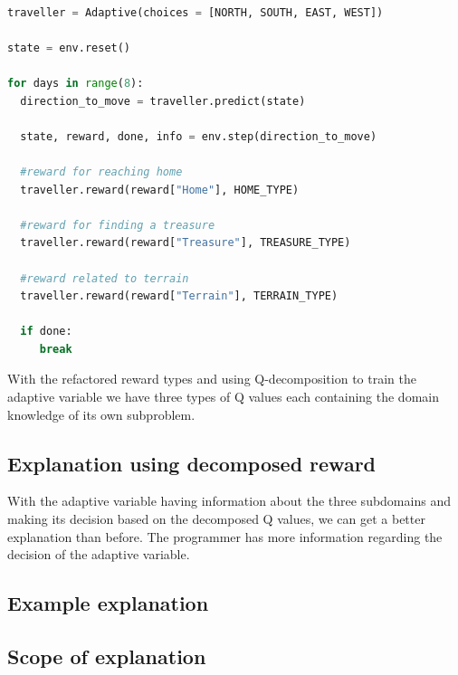 \documentclass[conference]{IEEEtran}
\begin{document}
\begin{lstlisting}[language = Python,
                   label = {lst:abp_reward_decomposition},
                   caption = {Adaptive Program using reward decomposition for traveller problem},
                   captionpos = b]

traveller = Adaptive(choices = [NORTH, SOUTH, EAST, WEST])

state = env.reset()

for days in range(8):
  direction_to_move = traveller.predict(state)

  state, reward, done, info = env.step(direction_to_move)

  #reward for reaching home
  traveller.reward(reward["Home"], HOME_TYPE)

  #reward for finding a treasure
  traveller.reward(reward["Treasure"], TREASURE_TYPE)

  #reward related to terrain
  traveller.reward(reward["Terrain"], TERRAIN_TYPE)

  if done:
     break

\end{lstlisting}

With the refactored reward types and using Q-decomposition \cite{russell2003q} to train the
adaptive variable we have three types of Q values each containing the domain knowledge of
its own subproblem.

\subsection{Explanation using decomposed reward}
With the adaptive variable having information about the three subdomains and making its decision
based on the decomposed Q values, we can get a better explanation than before. The programmer
has more information regarding the decision of the adaptive variable.



\subsection{Example explanation}

\subsection{Scope of explanation}
\end{document}
